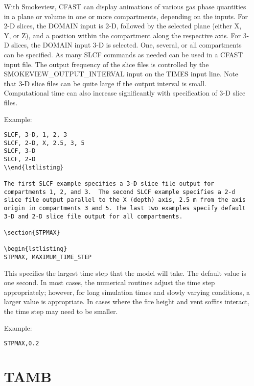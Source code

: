With Smokeview, CFAST can display animations of various gas phase quantities in a plane or volume in one or more compartments, depending on the inputs. For 2-D slices, the DOMAIN input is 2-D, followed by the selected plane (either X, Y, or Z), and a position within the compartment along the respective axis. For 3-D slices, the DOMAIN input 3-D is selected. One, several, or all compartments can be specified. As many SLCF commands as needed can be used in a CFAST input file.  The output frequency of the slice files is controlled by the SMOKEVIEW\_OUTPUT\_INTERVAL input on the TIMES input line. Note that 3-D slice files can be quite large if the output interval is small. Computational time can also increase significantly with specification of 3-D slice files.

Example:

\begin{lstlisting}
SLCF, 3-D, 1, 2, 3
SLCF, 2-D, X, 2.5, 3, 5
SLCF, 3-D
SLCF, 2-D
\\end{lstlisting}

The first SLCF example specifies a 3-D slice file output for compartments 1, 2, and 3.  The second SLCF example specifies a 2-d slice file output parallel to the X (depth) axis, 2.5 m from the axis origin in compartments 3 and 5. The last two examples specify default 3-D and 2-D slice file output for all compartments.

\section{STPMAX}

\begin{lstlisting}
STPMAX, MAXIMUM_TIME_STEP
\end{lstlisting}

This specifies the largest time step that the model will take. The default value is one second. In most cases, the numerical routines adjust the time step appropriately; however, for long simulation times and slowly varying conditions, a larger value is appropriate. In cases where the fire height and vent soffits interact, the time step may need to be smaller.

Example:

\begin{lstlisting}
STPMAX,0.2
\end{lstlisting}

\section{ TAMB}

